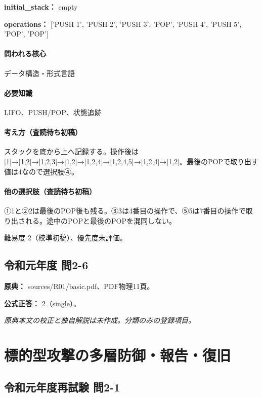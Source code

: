 \noindent\textbf{initial\_stack：} empty\par

\noindent\textbf{operations：} ['PUSH 1', 'PUSH 2', 'PUSH 3', 'POP', 'PUSH 4', 'PUSH 5', 'POP', 'POP']\par

\paragraph{問われる核心} データ構造・形式言語

\paragraph{必要知識} LIFO、PUSH/POP、状態追跡

\paragraph{考え方（査読待ち初稿）} スタックを底から上へ記録する。操作後は [1]→[1,2]→[1,2,3]→[1,2]→[1,2,4]→[1,2,4,5]→[1,2,4]→[1,2]。最後のPOPで取り出す値は4なので選択肢④。

\paragraph{他の選択肢（査読待ち初稿）} ①1と②2は最後のPOP後も残る。③3は4番目の操作で、⑤5は7番目の操作で取り出される。途中のPOPと最後のPOPを混同しない。

\par 難易度 2（校準初稿）、優先度未評価。

\subsection{令和元年度 問2-6}
\label{q:r01-reg-basic-2-6}

\noindent\textbf{原典：} sources/R01/basic.pdf、PDF物理11頁。

\textbf{公式正答：} 2（single）。

\par\textit{原典本文の校正と独自解説は未作成。分類のみの登録項目。}

\section{標的型攻撃の多層防御・報告・復旧}

\subsection{令和元年度再試験 問2-1}
\label{q:r01-ret-basic-2-1}

